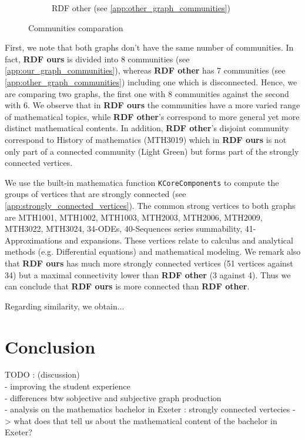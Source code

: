 \documentclass[english, 12pt]{article}
\begin{document}
\begin{figure}[H]
\begin{subfigure}[b]{0.45\textwidth}
        \caption{RDF other (see \ref{app:other_graph_communities})}
    \end{subfigure}
    \vspace{.5cm}
    \caption{Communities comparation}
    \label{fig:communities_comp}
\end{figure}


First, we note that both graphs don't have the same number of communities. In fact, {\bf RDF ours} is divided into 8 communities (see \ref{app:our_graph_communities}), whereas {\bf RDF other} has 7 communities (see \ref{app:other_graph_communities}) including one which is disconnected. Hence, we are comparing two graphs, the first one with 8 communities against the second with 6. We observe that in {\bf RDF ours} the communities have a more varied range of mathematical topics, while {\bf RDF other}'s correspond to more general yet more distinct mathematical contents.
In addition, {\bf RDF other}'s disjoint community correspond to History of mathematics (MTH3019) which in {\bf RDF ours} is not only part of a connected community (Light Green) but forms part of the strongly connected vertices.

We use the built-in mathematica function \texttt{KCoreComponents} to compute the groups of vertices that are strongly connected (see \ref{app:strongly_connected_vertices}). The common strong vertices to both graphs are MTH1001, MTH1002, MTH1003, MTH2003, MTH2006, MTH2009, MTH3022, MTH3024, 34-ODEs, 40-Sequences series summability, 41-Approximations and expansions. These vertices relate to calculus and analytical methods (e.g. Differential equations) and mathematical modeling.
We remark also that {\bf RDF ours} has much more strongly connected vertices (51 vertices against 34) but a maximal connectivity lower than {\bf RDF other} (3 against 4). Thus we can conclude that {\bf RDF ours} is more connected than {\bf RDF other}.

{\color{red} Regarding similarity, we obtain...}

\section{Conclusion}
{\color{red} TODO : (discussion)\\
  - improving the student experience\\
  - differences btw sobjective and subjective graph production\\
  - analysis on the mathematics bachelor in Exeter : strongly connected vertecies -> what does that tell us about the mathematical content of the bachelor in Exeter? 
}
\end{document}
